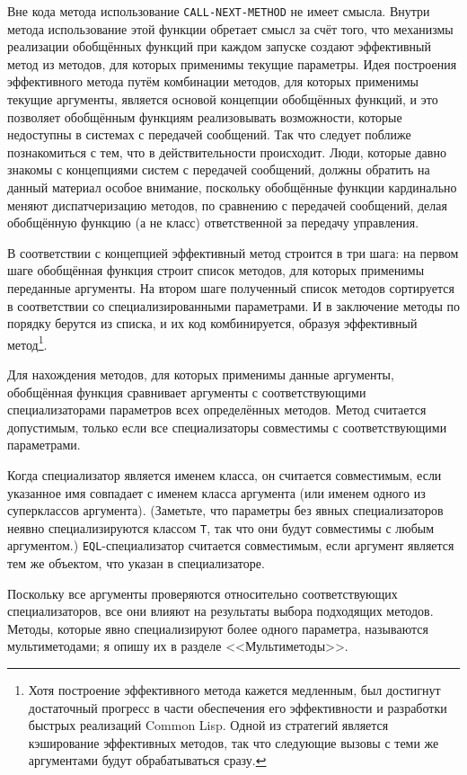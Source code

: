 Вне кода метода использование \lstinline{CALL-NEXT-METHOD} не имеет смысла.  Внутри метода
использование этой функции обретает смысл за счёт того, что механизмы реализации
обобщённых функций при каждом запуске создают эффективный метод из методов, для которых
применимы текущие параметры.  Идея построения эффективного метода путём комбинации
методов, для которых применимы текущие аргументы, является основой концепции обобщённых
функций, и это позволяет обобщённым функциям реа\-ли\-зо\-вы\-вать возможности, которые недоступны
в системах с передачей сообщений.  Так что следует поближе познакомиться с тем, что в
действительности происходит.  Люди, которые давно знакомы с концепциями систем с передачей
сообщений, должны обратить на данный материал особое внимание, поскольку обобщённые функции
кардинально меняют диспатчеризацию методов, по сравнению с передачей сообщений, делая
обобщённую функцию (а не класс) ответственной за передачу управления.

В соответствии с концепцией эффективный метод строится в три шага: на первом шаге
обобщённая функция строит список методов, для которых применимы переданные аргументы.  На
втором шаге полученный список методов сортируется в соответствии со специализированными
параметрами.  И в заключение методы по порядку берутся из списка, и их код комбинируется,
образуя эффективный метод\footnote{Хотя построение эффективного метода кажется медленным,
  был достигнут достаточный прогресс в части обеспечения его эффективности и разработки
  быстрых реализаций Common Lisp.  Одной из стратегий является кэширование эффективных
  методов, так что следующие вызовы с теми же аргументами будут обрабатываться сразу.}.

Для нахождения методов, для которых применимы данные аргументы, обобщённая функция
сравнивает аргументы с соответствующими специализаторами параметров всех определённых
методов.  Метод считается допустимым, только если все специализаторы совместимы с
соответствующими параметрами.

Когда специализатор является именем класса, он считается совместимым, если указанное имя
совпадает с именем класса аргумента (или именем одного из суперклассов аргумента).
(Заметьте, что параметры без явных специализаторов неявно специализируются классом
\lstinline{T}, так что они будут совместимы с любым аргументом.)  \lstinline{EQL}-специализатор
считается совместимым, если аргумент является тем же объектом, что указан в
специализаторе.

Поскольку все аргументы проверяются относительно соответствующих специализаторов, все они
влияют на результаты выбора подходящих методов.  Методы, которые явно специализируют более
одного параметра, называются мультиметодами; я опишу их в разделе <<Мультиметоды>>.

